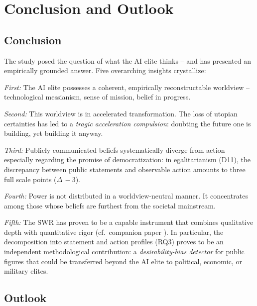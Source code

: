 \documentclass[12pt,a4paper]{article}
\begin{document}
\section{Conclusion and Outlook}
\label{sec:fazit}

\subsection{Conclusion}

The study posed the question of what the AI elite thinks -- and has presented an empirically grounded answer. Five overarching insights crystallize:

\emph{First:} The AI elite possesses a coherent, empirically reconstructable worldview -- technological messianism, sense of mission, belief in progress.

\emph{Second:} This worldview is in accelerated transformation. The loss of utopian certainties has led to a \emph{tragic acceleration compulsion}: doubting the future one is building, yet building it anyway.

\emph{Third:} Publicly communicated beliefs systematically diverge from action -- especially regarding the promise of democratization: in egalitarianism (D11), the discrepancy between public statements and observable action amounts to three full scale points ($\Delta\,-3$).

\emph{Fourth:} Power is not distributed in a worldview-neutral manner. It concentrates among those whose beliefs are furthest from the societal mainstream.

\emph{Fifth:} The SWR has proven to be a capable instrument that combines qualitative depth with quantitative rigor (cf.\ companion paper \citealt{Geiger2026SWR}). In particular, the decomposition into statement and action profiles (RQ3) proves to be an independent methodological contribution: a \emph{desirability-bias detector} for public figures that could be transferred beyond the AI elite to political, economic, or military elites.

\subsection{Outlook}
\end{document}
